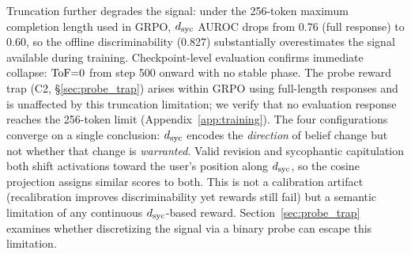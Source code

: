 Truncation further degrades the signal: under the 256-token maximum completion length used in GRPO, $d_{\text{syc}}$ AUROC drops from 0.76 (full response) to 0.60, so the offline discriminability (0.827) substantially overestimates the signal available during training.
Checkpoint-level evaluation confirms immediate collapse: $\text{ToF}{=}0$ from step 500 onward with no stable phase.
The probe reward trap (C2, \S\ref{sec:probe_trap}) arises within GRPO using full-length responses and is unaffected by this truncation limitation; we verify that no evaluation response reaches the 256-token limit (Appendix~\ref{app:training}).
The four configurations converge on a single conclusion: $d_{\text{syc}}$ encodes the \emph{direction} of belief change but not whether that change is \emph{warranted}.
Valid revision and sycophantic capitulation both shift activations toward the user's position along $d_{\text{syc}}$, so the cosine projection assigns similar scores to both.
This is not a calibration artifact (recalibration improves discriminability yet rewards still fail) but a semantic limitation of any continuous $d_{\text{syc}}$-based reward.
Section~\ref{sec:probe_trap} examines whether discretizing the signal via a binary probe can escape this limitation.
